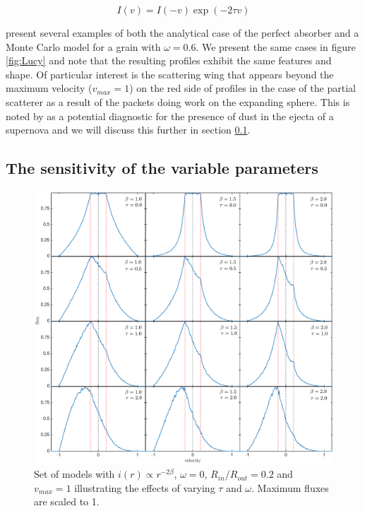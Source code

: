 \documentclass[useAMS,usenatbib,usegraphicx]{mnras}
\begin{document}
\[
I(v) = I(-v)\exp(-2\tau v)  
\]

\citet{Lucy1989a} present several examples of both the analytical case of the perfect absorber and a Monte Carlo model for a grain with $\omega =0.6$.  We present the same cases in figure \ref{fig:Lucy} and note that the resulting profiles exhibit the same features and shape. Of particular interest is the scattering wing that appears beyond the maximum velocity ($v_{max}=1$) on the red side of profiles in the case of the partial scatterer as a result of the packets doing work on the expanding sphere.  This is noted by \citet{Lucy1989a} as a potential diagnostic for the presence of dust in the ejecta of a supernova and we will discuss this further in section \ref{ps}.




\subsection{The sensitivity of the variable parameters}
\label{ps}

\begin{figure}
\includegraphics[trim =80 10 6 15,clip=true,scale=0.515]{params/D/newDall} 
\caption{Set of models with $i(r) \propto r^{-2\beta}$, $\omega=0$, $R_{in}/R_{out}=0.2$ and $v_{max}=1$ illustrating the effects of varying $\tau$ and $\omega$.  Maximum fluxes are scaled to 1.}
\label{bt}
\end{figure}
\end{document}
